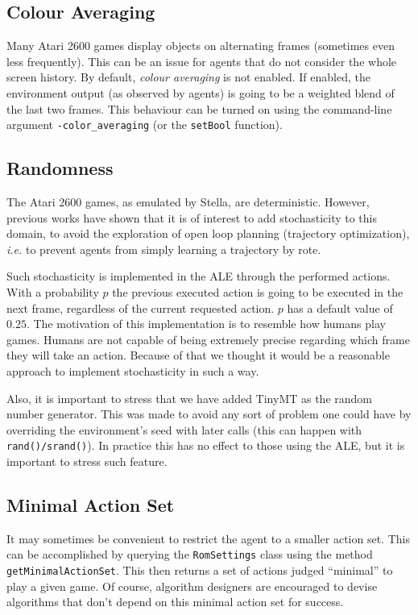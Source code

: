 \documentclass[12pt]{article}
\begin{document}
\subsection{Colour Averaging}

Many Atari 2600 games display objects on alternating frames (sometimes even less frequently).
This can be an issue for agents that do not consider the whole screen history. By default, 
\emph{colour averaging} is not enabled. If enabled, the environment output (as observed by agents)
is going to be a weighted blend of the last two frames. This behaviour can be turned on using the
command-line argument \verb+-color_averaging+ (or the \verb+setBool+ function).

\subsection{Randomness}

The Atari 2600 games, as emulated by Stella, are deterministic. However, previous works have shown 
that it is of interest to add stochasticity to this domain, to avoid the exploration of open loop 
planning (trajectory optimization), \emph{i.e.} to prevent agents from simply learning a trajectory by
rote. 

Such stochasticity is implemented in the ALE through the performed actions. With a probability $p$ 
the previous executed action is going to be executed in the next frame, regardless of the current 
requested action. $p$ has a default value of $0.25$. The motivation of this implementation is to 
resemble how humans play games. Humans are not capable of being extremely precise regarding which 
frame they will take an action. Because of that we thought it would be a reasonable approach to 
implement stochasticity in such a way.

Also,  it is important to stress that we have added TinyMT as the random number generator. This was 
made to avoid any sort of problem one could have by overriding the environment's seed with later 
calls (this can happen with \verb+rand()/srand()+). In practice this has no effect to those using
the ALE, but it is important to stress such feature.

\subsection{Minimal Action Set}

It may sometimes be convenient to restrict the agent to a smaller action set. This can be
accomplished by querying the \verb+RomSettings+ class using the method 
\verb+getMinimalActionSet+. This then returns a set of actions judged ``minimal'' to play a given
game. Of course, algorithm designers are encouraged to devise algorithms that don't depend 
on this minimal action set for success.
\end{document}
